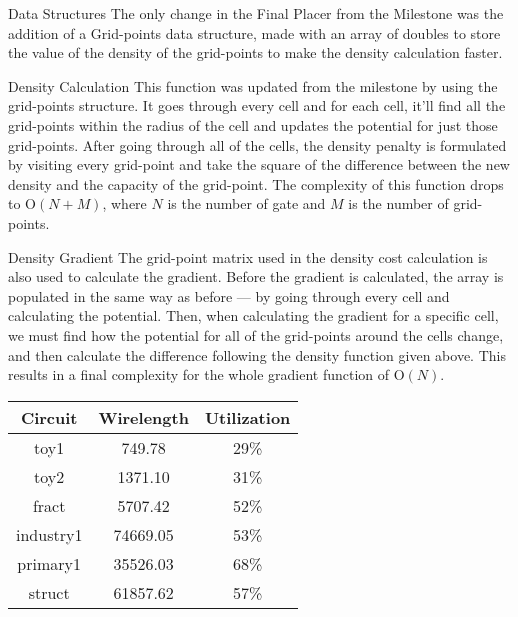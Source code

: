 \documentclass[9pt]{extarticle}
\begin{document}
\begin{homeworkProblem}
    
    \begin{homeworkSection}{Data Structures}
        The only change in the Final Placer from the Milestone was the addition of a Grid-points data structure, made with an array of doubles to store the value of the density of the grid-points to make the density calculation faster. 
    \end{homeworkSection}

    \begin{homeworkSection}{Density Calculation}
        This function was updated from the milestone by using the grid-points structure. It goes through every cell and for each cell, it'll find all the grid-points within the radius of the cell and updates the potential for just those grid-points. After going through all of the cells, the density penalty is formulated by visiting every grid-point and take the square of the difference between the new density and the capacity of the grid-point. The complexity of this function drops to
        $\textrm{O}(N+M)$, where $N$ is the number of gate and $M$ is the number of grid-points.  
    \end{homeworkSection}
    
    \begin{homeworkSection}{Density Gradient}
        The grid-point matrix used in the density cost calculation is also used to calculate the gradient. Before the gradient is calculated, the array is populated in the same way as before --- by going through every cell and calculating the potential. Then, when calculating the gradient for a specific cell, we must find how the potential for all of the grid-points around the cells change, and then calculate the difference following the density function given above. This results in a
        final complexity for the whole gradient function of $\textrm{O}(N)$.
    \end{homeworkSection}

\end{homeworkProblem}

\begin{homeworkProblem}
    \begin{center}
        \begin{tabular}{c|c|c}
        Circuit & Wirelength & Utilization\\ \hline \hline
        toy1 & 749.78 & 29\%\\ 
        toy2 & 1371.10 & 31\%\\
        fract & 5707.42 & 52\%\\
        industry1 & 74669.05 & 53\%\\
        primary1 & 35526.03 & 68\%\\
        struct & 61857.62 & 57\%\\
        \end{tabular}
    \end{center}

\end{homeworkProblem}
\end{document}
